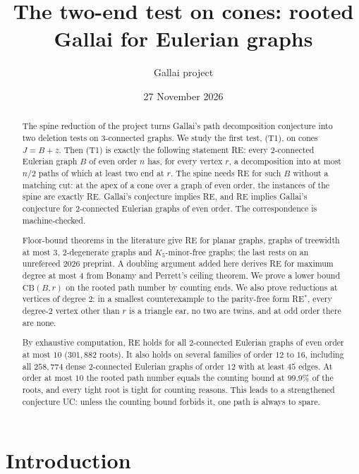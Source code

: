 \documentclass[11pt]{amsart}
\title{The two-end test on cones: rooted Gallai for Eulerian graphs}
\author{Gallai project}
\date{27 November 2026}
\theoremstyle{definition}
\newcommand{\CB}{\mathrm{CB}}
\begin{document}
\sloppy

\begin{abstract}
The spine reduction of the project turns Gallai's path decomposition conjecture into two deletion
tests on $3$-connected graphs. We study the first test, (T1), on cones $J=B+z$. Then (T1) is exactly
the following statement RE: every $2$-connected Eulerian graph $B$ of even order $n$ has, for every
vertex $r$, a decomposition into at most $n/2$ paths of which at least two end at $r$. The spine needs
RE for such $B$ without a matching cut: at the apex of a cone over a graph of even order, the
instances of the spine are exactly RE. Gallai's conjecture implies RE, and RE implies Gallai's
conjecture for $2$-connected Eulerian graphs of even order. The correspondence is machine-checked.

Floor-bound theorems in the literature give RE for planar graphs, graphs of treewidth at most $3$,
$2$-degenerate graphs and $K_5$-minor-free graphs; the last rests on an unrefereed 2026 preprint. A doubling argument added here derives RE for
maximum degree at most $4$ from Bonamy and Perrett's ceiling theorem. We prove a lower bound
$\CB(B,r)$ on the rooted path number by counting ends. We also prove reductions at vertices of
degree $2$: in a smallest counterexample to the parity-free form RE$^*$, every degree-$2$ vertex other
than $r$ is a triangle ear, no two are twins, and at odd order there are none.

By exhaustive computation, RE holds for all $2$-connected Eulerian graphs of even order at most $10$
($301{,}882$ roots). It also holds on several families of order $12$ to $16$, including all
$258{,}774$ dense $2$-connected Eulerian graphs of order $12$ with at least $45$ edges. At order at
most $10$ the rooted path number equals the counting bound at $99.9\%$ of the roots, and every tight
root is tight for counting reasons. This leads to a strengthened conjecture UC: unless the counting
bound forbids it, one path is always to spare.
\end{abstract}

\maketitle

\section{Introduction}
\end{document}
